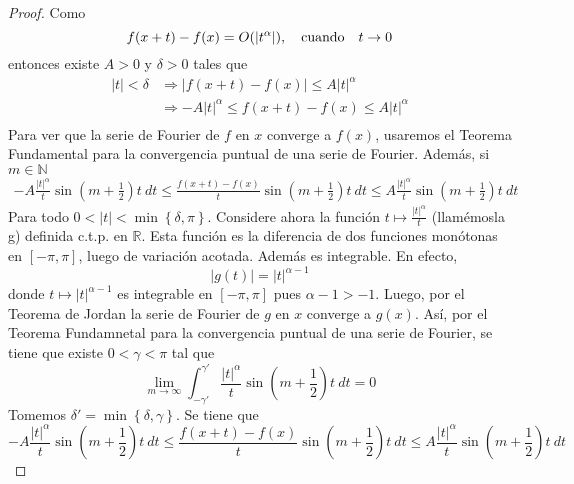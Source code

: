 \documentclass[12pt]{report}
\theoremstyle{largebreak}
\newcommand\abs[1]{\ensuremath{\left|#1\right|}}
\begin{document}
    \begin{proof}
        Como
        \begin{equation*}
            f(x+t)-f(x)=O(\abs{t^\alpha}),\quad\textup{cuando}\quad t\rightarrow 0
        \end{equation*}
        entonces existe $A>0$ y $\delta>0$ tales que
        \begin{equation*}
            \begin{split}
                \abs{t}<\delta&\Rightarrow \abs{f(x+t)-f(x)}\leq A\abs{t}^\alpha\\
                &\Rightarrow -A\abs{t}^\alpha\leq f(x+t)-f(x)\leq A\abs{t}^\alpha\\
            \end{split}
        \end{equation*}
        Para ver que la serie de Fourier de $f$ en $x$ converge a $f(x)$, usaremos el Teorema Fundamental para la convergencia puntual de una serie de Fourier. Además, si $m\in\mathbb{N}$
        \begin{equation*}
            \begin{split}
                -A\frac{\abs{t}^\alpha}{t}\sin\left(m+\frac{1}{2}\right)t\:dt \leq \frac{f(x+t)-f(x)}{t}\sin\left(m+\frac{1}{2}\right)t\:dt\leq A\frac{\abs{t}^\alpha}{t}\sin\left(m+\frac{1}{2}\right)t\:dt
            \end{split}
        \end{equation*}
        Para todo $0<\abs{t}<\min\left\{\delta,\pi\right\}$. Considere ahora la función $t\mapsto\frac{\abs{t}^\alpha}{t}$ (llamémosla g) definida c.t.p. en $\mathbb{R}$. Esta función es la diferencia de dos funciones monótonas en $[-\pi,\pi]$, luego de variación acotada. Además es integrable. En efecto,
        \begin{equation*}
            \abs{g(t)}=\abs{t}^{\alpha-1}
        \end{equation*}
        donde $t\mapsto \abs{t}^{\alpha-1}$ es integrable en $[-\pi,\pi]$ pues $\alpha-1>-1$. Luego, por el Teorema de Jordan la serie de Fourier de $g$ en $x$ converge a $g(x)$. Así, por el Teorema Fundamnetal para la convergencia puntual de una serie de Fourier, se tiene que existe $0<\gamma<\pi$ tal que
        \begin{equation*}
            \lim_{ m\rightarrow\infty}\int_{-\gamma'}^{\gamma'}\frac{\abs{t}^\alpha}{t}\sin\left(m+\frac{1}{2}\right)t\:dt=0
        \end{equation*}
        Tomemos $\delta'=\min\left\{\delta,\gamma\right\}$. Se tiene que
        \begin{equation*}
            -A\frac{\abs{t}^\alpha}{t}\sin\left(m+\frac{1}{2}\right)t\:dt \leq \frac{f(x+t)-f(x)}{t}\sin\left(m+\frac{1}{2}\right)t\:dt\leq A\frac{\abs{t}^\alpha}{t}\sin\left(m+\frac{1}{2}\right)t\:dt
        \end{equation*}
    \end{proof}
\end{document}
